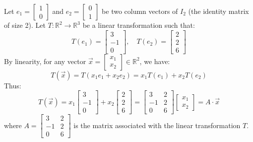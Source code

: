 \begin{eg}
    Let $e_1 = \begin{bmatrix} 1 \\ 0 \end{bmatrix}$ and $e_2 = \begin{bmatrix} 0 \\ 1 \end{bmatrix}$ be two column vectors of $I_2$ (the identity matrix of size 2). Let $T: \mathbb{R}^2 \to \mathbb{R}^3$ be a linear transformation such that:
    \[
        T(e_1) = \begin{bmatrix} 3 \\ -1 \\ 0 \end{bmatrix}, \quad T(e_2) = \begin{bmatrix} 2 \\ 2 \\ 6 \end{bmatrix}
    \]
    By linearity, for any vector $\vec{x} = \begin{bmatrix} x_1 \\ x_2 \end{bmatrix} \in \mathbb{R}^2$, we have:
    \[
        T(\vec{x}) = T(x_1 e_1 + x_2 e_2) = x_1 T(e_1) + x_2 T(e_2)
    \]
    Thus:
    \[
        T(\vec{x}) = x_1 \begin{bmatrix} 3 \\ -1 \\ 0 \end{bmatrix} + x_2 \begin{bmatrix} 2 \\ 2 \\ 6 \end{bmatrix} = \begin{bmatrix}3 & 2 \\ -1 & 2 \\ 0 & 6\end{bmatrix} \begin{bmatrix} x_1 \\ x_2 \end{bmatrix} = A \cdot \vec{x}
    \]
    where $A = \begin{bmatrix}3 & 2 \\ -1 & 2 \\ 0 & 6\end{bmatrix}$ is the matrix associated with the linear transformation $T$.
\end{eg}

